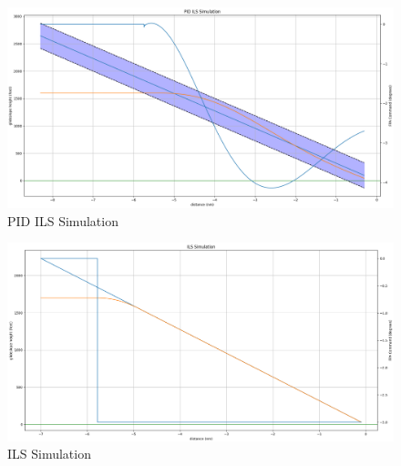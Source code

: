 \documentclass{article}
\begin{document}
\begin{figure}
    \includegraphics[width=\textwidth]{diagrams/pidilssim.png}
    \caption{\label{fig:pidilssim}PID ILS Simulation}
\end{figure}

\begin{figure}
    \includegraphics[width=\textwidth]{diagrams/ilssim.png}
    \caption{\label{fig:ilssim}ILS Simulation}
\end{figure}

\clearpage
\end{document}
